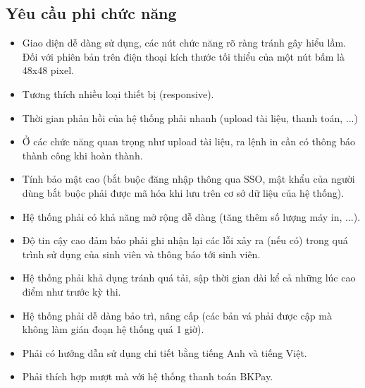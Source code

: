 \documentclass[a4paper]{article}
\begin{document}
\subsection{Yêu cầu phi chức năng}
\begin{itemize}
    \item Giao diện dễ dàng sử dụng, các nút chức năng rõ ràng tránh gây hiểu lầm. Đối với phiên bản trên điện thoại kích thước tối thiểu của một nút bấm là 48x48 pixel.
    \item Tương thích nhiều loại thiết bị (responsive).
    \item Thời gian phản hồi của hệ thống phải nhanh (upload tài liệu, thanh toán, ...)
    \item Ở các chức năng quan trọng như upload tài liệu, ra lệnh in cần có thông báo thành công khi hoàn thành.
    \item Tính bảo mật cao (bắt buộc đăng nhập thông qua SSO, mật khẩu của người dùng bắt buộc phải được mã hóa khi lưu trên cơ sở dữ liệu của hệ thống).
    \item Hệ thống phải có khả năng mở rộng dễ dàng (tăng thêm số lượng máy in, ...).
    \item Độ tin cậy cao đảm bảo phải ghi nhận lại các lỗi xảy ra (nếu có) trong quá trình sử dụng của sinh viên và thông báo tới sinh viên.
    \item Hệ thống phải khả dụng tránh quá tải, sập thời gian dài kể cả những lúc cao điểm như trước kỳ thi.
    \item Hệ thống phải dễ dàng bảo trì, nâng cấp (các bản vá phải được cập mà không làm gián đoạn hệ thống quá 1 giờ).
    \item Phải có hướng dẫn sử dụng chi tiết bằng tiếng Anh và tiếng Việt.
    \item Phải thích hợp mượt mà với hệ thống thanh toán BKPay.
\end{itemize}
\newpage
\end{document}
